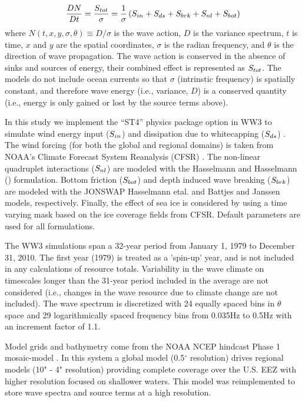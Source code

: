 \begin{align}
  \frac{DN}{Dt} = \frac{S_{ tot }}{\sigma} = \frac{1}{\sigma}\left ( S_{ in } + S_{ ds } + S_{ brk } + S_{ nl } + S_{ bot } \right )
\end{align}
where $N(t,x,y,\sigma,\theta) \equiv D/\sigma$ is the wave action, $D$ is the variance spectrum, $t$ is time, $x$ and $y$ are the spatial coordinates, $\sigma$ is the radian frequency, and $\theta$ is the direction of wave propagation.
The wave action is conserved in the absence of sinks and sources of energy, their combined effect is represented as $S_{ tot }$.
The models do not include ocean currents so that $\sigma$ (intrinstic frequency) is spatially constant, and therefore wave energy (i.e., variance, $D$) is a conserved quantity (i.e., energy is only gained or lost by the source terms above).

In this study we implement the ``ST4'' physics package option in WW3 to simulate wind energy input ($S_{ in }$) and dissipation due to whitecapping ($S_{ ds }$) \citep{ardhuinObservationSwellDissipation2009}.
The wind forcing (for both the global and regional domains) is taken from NOAA's Climate Forecast System Reanalysis (CFSR) \citep{sahaNCEPClimateForecast2010}. The non-linear quadruplet interactions ($S_{ nl }$) are modeled with the Hasselmann and Hasselmann (\citeyear{hasselmannComputationsParameterizationsNonlinear1985}) formulation. Bottom friction ($S_{ bot }$) and depth induced wave breaking ($S_{ brk }$) are modeled with the JONSWAP Hasselmann etal. \citeyear{hasselmannMeasurementsWindwaveGrowth1973} and Battjes and Janssen \citeyear{battjesEnergyLossSetup1978} models, respectively. Finally, the effect of sea ice is considered by using a time varying mask based on the ice coverage fields from CFSR. Default parameters are used for all formulations.

The WW3 simulations span a 32-year period from January 1, 1979 to December 31, 2010. The first year (1979) is treated as a 'spin-up' year, and is not included in any calculations of resource totals. Variability in the wave climate on timescales longer than the 31-year period included in the average are not considered (i.e., changes in the wave resource due to climate change are not included). The wave spectrum is discretized with 24 equally spaced bins in $\theta$ space and 29 logarithmically spaced frequency bins from 0.035Hz to 0.5Hz with an increment factor of 1.1. 

Model grids and bathymetry come from the NOAA NCEP hindcast Phase 1 mosaic-model \citep{chawla2011wavewatch,chawla201230}. In this system a global model (0.5$^{\circ}$ resolution) drives regional models (10" - 4" resolution) providing complete coverage over the U.S. EEZ with higher resolution focused on shallower waters. This model was reimplemented to store wave spectra and source terms at a high resolution.

